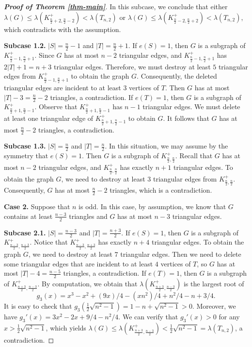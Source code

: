 \documentclass[11pt]{article}
\begin{document}
\begin{proof}[{\bf Proof of Theorem \ref{thm-main}}]
In this subcase, we conclude that 
 either $\lambda (G) \le \lambda (K_{\frac{n}{2} +2, \frac{n}{2} -2}^+) < \lambda (T_{n,2}) $ or 
 $\lambda (G)\le  \lambda (K_{\frac{n}{2} -2, \frac{n}{2} +2}^+) < \lambda (T_{n,2}) $, which contradicts with the assumption. 

{\bf Subcase 1.2.}  $|S|= \frac{n}{2} -1$ and $|T|=\frac{n}{2} +1$.  
If $e(S)=1$, then $G$ is a subgraph of $K_{\frac{n}{2} -1, \frac{n}{2} +1}^+$. Since $G$ has at most $n-2$ triangular edges, 
and $K_{\frac{n}{2} -1, \frac{n}{2} +1}^+$ has $2|T|+1=n+3$ triangular edges. 
Therefore, we must destroy at least $5$ triangular edges from 
$K_{\frac{n}{2} -1, \frac{n}{2} +1}^+$ to obtain the graph $G$. 
Consequently, the deleted triangular edges are incident to at least $3$ vertices of $T$. 
Then $G$ has at most $|T| -3 = \frac{n}{2}-2$ triangles, a contradiction.  
If $e(T)=1$, then 
$G$ is a subgraph of $K_{\frac{n}{2} +1, \frac{n}{2} -1}^+$. 
Observe that $K_{\frac{n}{2} +1, \frac{n}{2} -1}^+$ has $n-1$ triangular edges. We must delete at least one triangular edge of $K_{\frac{n}{2} +1, \frac{n}{2} -1}^+$ to obtain $G$. 
It follows that $G$ has at most $\frac{n}{2} -2$ 
 triangles, a contradiction. 




{\bf Subcase 1.3.}  $|S|= \frac{n}{2} $ and $|T|=\frac{n}{2} $.  
In this situation, 
we may assume by the symmetry that $e(S)=1$. 
Then $G$ is a subgraph of $K_{\frac{n}{2} , \frac{n}{2}}^+$. 
Recall that $G$ has at most $n-2$ triangular edges, and 
$K_{\frac{n}{2} , \frac{n}{2}}^+$ has exactly $n+1$ triangular edges. 
To obtain the graph $G$,  we need to destroy at least $3$ triangular edges 
 from $K_{\frac{n}{2} , \frac{n}{2}}^+$.  
 Consequently, $G$ has at most $\frac{n}{2} -2$ triangles, 
 which is a contradiction. 
 



\medskip 
{\bf Case 2.} Suppose that $n$ is odd. In this case, by assumption, 
we know that 
$G$ contains at least $\frac{n-3}{2}$ triangles 
and $G$ has at most $n-3$ triangular edges.  

{\bf Subcase 2.1.}  $|S|= \frac{n-3}{2} $ and $|T|=\frac{n+3}{2}$. 
If $e(S)=1$, then $G$ is a subgraph of $K_{\frac{n-3}{2} , \frac{n+3}{2} }^+$. 
Notice that $K_{\frac{n-3}{2} , \frac{n+3}{2} }^+$ has exactly 
$n+4$ triangular edges. 
To obtain the graph $G$, we need to destroy 
at least $7$ triangular edges. 
Then we need to delete some triangular edges that 
are incident to at least $4$ vertices of $T$,  so 
$G$ has at most $|T|-4=\frac{n-5}{2} $ triangles, 
a contradiction. 
If $e(T)=1$, then $G$ is a subgraph of $K_{\frac{n+3}{2} , \frac{n-3}{2} }^+$. By computation, we obtain that 
$\lambda (K_{\frac{n+3}{2} , \frac{n-3}{2} }^+)$ is the largest root of 
\[ g_3(x)=x^3 - x^2 + (9 x)/4 - (x n^2)/4 + n^2/4 - n + 3/4.  \]
It is easy to check that $g_3(\frac{1}{2}\sqrt{n^2-1})= 
1 - n + \sqrt{ n^2-1}>0$. 
Moreover, we have $g_3'(x)=3x^2 -2x + 9/4 - n^2/4$. 
We can verify that $g_3'(x)>0$ for any $x> \frac{1}{2}\sqrt{n^2-1}$, 
which yields $ 
\lambda (G)\le \lambda (K_{\frac{n+3}{2} , \frac{n-3}{2} }^+) <  \frac{1}{2}\sqrt{n^2-1} = \lambda (T_{n,2})$, a contradiction. 


\end{proof}
\end{document}
